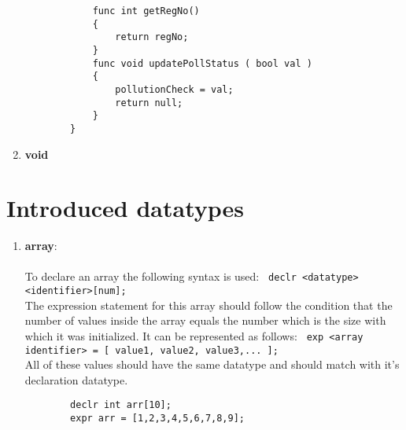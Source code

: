 \documentclass[journal, 18pt]{report}
\begin{document}
\begin{enumerate}
\begin{lstlisting}
            func int getRegNo()
            {
                return regNo;
            }
            func void updatePollStatus ( bool val )
            {
                pollutionCheck = val;
                return null;
            }
        }
    \end{lstlisting}
    \item \textbf{void}
\end{enumerate}
\section{Introduced datatypes}
\begin{enumerate}
    \item \textbf{array}:\\\\ To declare an array the following syntax is used: \texttt{ declr <datatype> <identifier>[num]; }\\
    The expression statement for this array should follow the condition that the number of values inside the array equals the number which is the size with which it was initialized. It can be represented as follows: \texttt{ exp <array identifier> = [ value1, value2, value3,... ];}\\
    All of these values should have the same datatype and should match with it's declaration datatype.\\
    \begin{lstlisting}
        declr int arr[10];
        expr arr = [1,2,3,4,5,6,7,8,9];


\end{lstlisting}
\end{enumerate}
\end{document}
